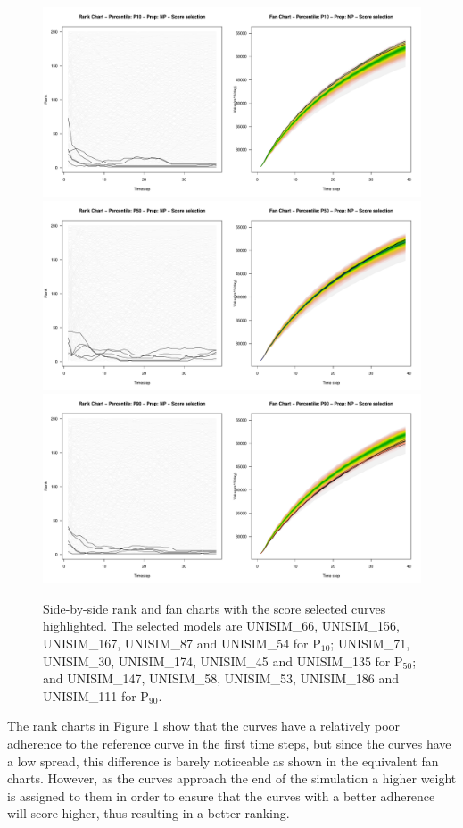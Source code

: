 \documentclass[final,5p,times,twocolumn]{elsarticle}
\begin{document}
\begin{figure}[H]
  \centering
  \includegraphics[width=0.78\columnwidth]{rank-fan-score-p10.pdf}
  \includegraphics[width=0.78\columnwidth]{rank-fan-score-p50.pdf}
  \includegraphics[width=0.78\columnwidth]{rank-fan-score-p90.pdf}
  \caption{Side-by-side rank and fan charts with the score selected curves highlighted. The selected models are UNISIM\_66, UNISIM\_156, UNISIM\_167, UNISIM\_87 and UNISIM\_54 for P$_{10}$; UNISIM\_71, UNISIM\_30, UNISIM\_174, UNISIM\_45 and UNISIM\_135 for P$_{50}$; and UNISIM\_147, UNISIM\_58, UNISIM\_53, UNISIM\_186 and UNISIM\_111 for P$_{90}$.}
  \label{fig:rank-fan-score}
\end{figure}

The rank charts in Figure \ref{fig:rank-fan-score} show that the curves have a relatively poor adherence to the reference curve in the first time steps, but since the curves have a low spread, this difference is barely noticeable as shown in the equivalent fan charts. However, as the curves approach the end of the simulation a higher weight is assigned to them in order to ensure that the curves with a better adherence will score higher, thus resulting in a better ranking.
\end{document}
